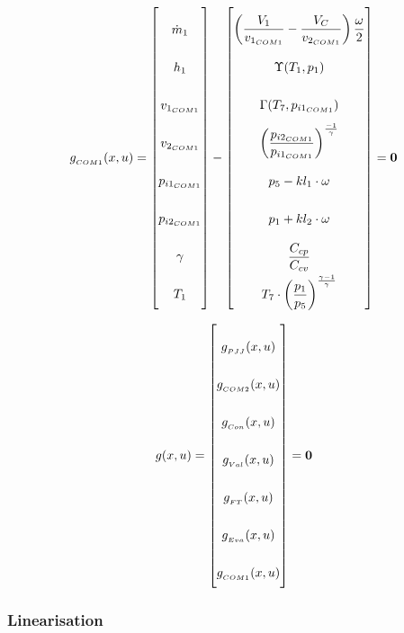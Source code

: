 \begin{equation} \label{eq:Gcs1}\renewcommand{\arraystretch}{2.5}
	g_{_{COM1}}(x,u) =  \begin{bmatrix}
		\dot{m}_1  		 	\\ %
		h_{1}				\\ %
		v_{1_{COM1}}			\\ %
		v_{2_{COM1}}			\\ %
		p_{i1_{COM1}}		\\ %
		p_{i2_{COM1}}		\\ %
		\gamma				\\ %
		T_{1}				\\ %
	\end{bmatrix}
	-
	\begin{bmatrix}
		\left(\dfrac{V_1}{v_{1_{COM1}}} - \dfrac{V_C}{v_{2_{COM1}}}\right) \dfrac{\omega}{2} \\			%
		\Upsilon(T_{1}, p_{1})		\\													%
		\Gamma(T_{7},p_{i1_{COM1}}) \\													%
		\left(\dfrac{p_{i2_{COM1}}}{p_{i1_{COM1}}}\right)^{\frac{-1}{\gamma}} \\		%
		p_{5} - kl_1 \cdot \omega \\													%
		p_{1} + kl_2 \cdot \omega \\													%
		\dfrac{C_{cp}}{C_{cv}} \\												%
		T_{7}\cdot \left(\dfrac{p_{1}}{p_{5}}\right)^{\frac{\gamma-1}{\gamma}}	\\		%
	\end{bmatrix}
	=\textbf{0}
\end{equation}


\begin{equation} \label{eq:Gtotal}\renewcommand{\arraystretch}{2.5}
	g(x,u) =  \begin{bmatrix}
		g_{_{PJJ}}(x,u)  		 	\\ %
		g_{_{COM2}}(x,u)				\\ %
		g_{_{Con}}(x,u)			\\ %
		g_{_{Val}}(x,u)			\\ %
		g_{_{FT}}(x,u)		\\ %
		g_{_{Eva}}(x,u)		\\ %
		g_{_{COM1}}(x,u)			\\
	\end{bmatrix}
	= \textbf{0}
\end{equation}




\newpage
\subsubsection{Linearisation}